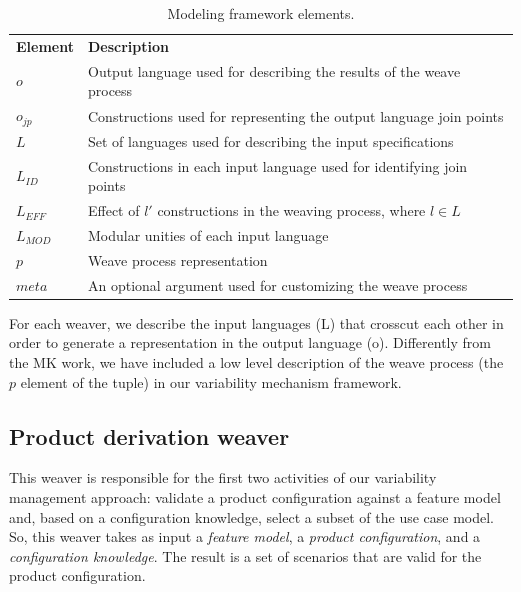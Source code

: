 \documentclass{acm_proc_article-sp}
\begin{document}
\begin{table}[h]
\begin{center}
\begin{small}
\caption{Modeling framework elements.} \label{tab:tup-01}
\begin{tabular}{ll}
  \hline\noalign{\smallskip}
  {\bf Element} & {\bf Description} \\ 
  \noalign{\smallskip}
  \hline
  \noalign{\smallskip}
  $o$              & Output language used for describing the results of the weave process \\ 
  $o_{jp}$       & Constructions used for representing the output language join points \\ 
  $L$              & Set of languages used for describing the input specifications \\ 
  $L_{ID}$      & Constructions in each input language used for identifying join points \\ 
  $L_{EFF}$   & Effect of $l'$ constructions in the weaving process, where $l \in L$ \\ 
  $L_{MOD}$  & Modular unities of each input language \\ 
  $p$               & Weave process representation \\ 
  $meta$         & An optional argument used for customizing the weave process \\ 
  \hline
\end{tabular}
\end{small}
\end{center}
\end{table}

For each weaver, we describe the input languages (L) that crosscut each other in order to generate 
a representation in the output language (o). Differently from the MK work, we have included a 
low level description of the weave process (the $p$ element of the tuple) in our variability 
mechanism framework. 

\subsection{Product derivation weaver}\label{sub:pd-weaver}

This weaver is responsible for the first two activities of our 
variability management approach: validate a product configuration 
against  a feature model and, based on a configuration knowledge, select 
a subset of the use case model. So, this weaver takes as input a
\emph{feature model}, a \emph{product configuration}, and a \emph{configuration knowledge}.
The result is a set of scenarios that are valid for the product configuration.
\end{document}
